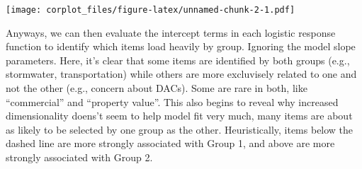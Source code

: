 \documentclass[
]{article}
\newenvironment{Shaded}{\begin{snugshade}}{\end{snugshade}}
\newcommand{\DataTypeTok}[1]{\textcolor[rgb]{0.13,0.29,0.53}{#1}}
\newcommand{\DecValTok}[1]{\textcolor[rgb]{0.00,0.00,0.81}{#1}}
\newcommand{\KeywordTok}[1]{\textcolor[rgb]{0.13,0.29,0.53}{\textbf{#1}}}
\newcommand{\NormalTok}[1]{#1}
\newcommand{\OperatorTok}[1]{\textcolor[rgb]{0.81,0.36,0.00}{\textbf{#1}}}
\newcommand{\StringTok}[1]{\textcolor[rgb]{0.31,0.60,0.02}{#1}}
\begin{document}
\begin{Shaded}
\end{Shaded}

\texttt{[image: corplot\_files/figure-latex/unnamed-chunk-2-1.pdf]}

Anyways, we can then evaluate the intercept terms in each logistic
response function to identify which items load heavily by group.
Ignoring the model slope parameters. Here, it's clear that some items
are identified by both groups (e.g., stormwater, transportation) while
others are more excluvisely related to one and not the other (e.g.,
concern about DACs). Some are rare in both, like ``commercial'' and
``property value''. This also begins to reveal why increased
dimensionality doens't seem to help model fit very much, many items are
about as likely to be selected by one group as the other. Heuristically,
items below the dashed line are more strongly associated with Group 1,
and above are more strongly associated with Group 2.
\end{document}
